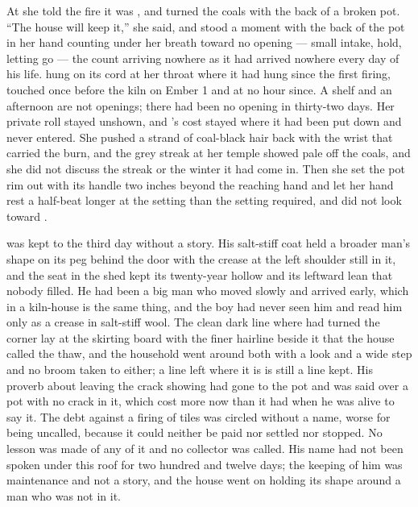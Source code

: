 At  she told the fire it was , and turned the coals with the back of a broken pot. “The house will keep it,” she said, and stood a moment with the back of the pot in her hand counting under her breath toward no opening --- small intake, hold, letting go --- the count arriving nowhere as it had arrived nowhere every day of his life.  hung on its cord at her throat where it had hung since the first firing, touched once before the kiln on Ember 1 and at no hour since. A shelf and an afternoon are not openings; there had been no opening in thirty-two days. Her private roll stayed unshown, and 's cost stayed where it had been put down and never entered. She pushed a strand of coal-black hair back with the wrist that carried the burn, and the grey streak at her temple showed pale off the coals, and she did not discuss the streak or the winter it had come in. Then she set the pot rim out with its handle two inches beyond the reaching hand and let her hand rest a half-beat longer at the setting than the setting required, and did not look toward .

\scenebreak

 was kept to the third day without a story. His salt-stiff coat held a broader man's shape on its peg behind the door with the crease at the left shoulder still in it, and the seat in the shed kept its twenty-year hollow and its leftward lean that nobody filled. He had been a big man who moved slowly and arrived early, which in a kiln-house is the same thing, and the boy had never seen him and read him only as a crease in salt-stiff wool. The clean dark line where  had turned the corner lay at the skirting board with the finer hairline beside it that the house called the thaw, and the household went around both with a look and a wide step and no broom taken to either; a line left where it is is still a line kept. His proverb about leaving the crack showing had gone to the pot and was said over a pot with no crack in it, which cost more now than it had when he was alive to say it. The debt against a firing of tiles was circled without a name, worse for being uncalled, because it could neither be paid nor settled nor stopped. No lesson was made of any of it and no collector was called. His name had not been spoken under this roof for two hundred and twelve days; the keeping of him was maintenance and not a story, and the house went on holding its shape around a man who was not in it.

